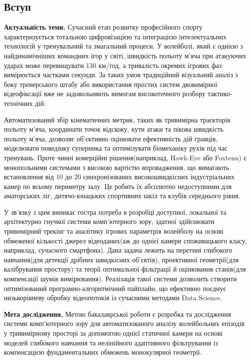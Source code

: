 \begin{unnumbered}

\section{Вступ}
\textbf{Актуальність теми. } Сучасний етап розвитку професійного спорту  характеризується тотальною цифровізацією та
інтеграцією інтелектуальних  технологій у тренувальний та змагальний процеси. У волейболі, який є однією з
найдинамічніших командних ігор у світі, швидкість польоту м'яча при  атакуючих ударах може перевищувати 130 км/год,
а тривалість окремих ігрових фаз вимірюється частками секунди. За таких умов традиційний візуальний аналіз з боку
тренерського штабу або використання простих систем двовимірної відеофіксації вже не задовольняють вимогам високоточного
розбору тактико-технічних дій.

Автоматизований збір кінематичних метрик, таких як тривимірна траєкторія польоту м'яча, координати точок відскоку,
кути атаки та пікова швидкість польоту м'яча, дозволяє об'єктивно оцінювати ефективність дій гравців, моделювати
поведінку суперника та оптимізувати біомеханіку рухів під
час тренувань. Проте чинні комерційні рішення(наприклад, Hawk-Eye або Foxtenn) є монопольними системами з високою
вартістю впровадження, що вимагають встановлення від 10 до 20 синхронізованих високошвидкісних індустріальних камер
по всьому периметру залу. Це робить їх абсолютно недоступними для аматорських ліг, дитячо-юнацьких спортивних шкіл
та клубів середнього рівня.

У зв'язку з цим виникає гостра потреба в розробці доступної, локальної та архітектурно гнучкої системи комп'ютерного
зору, здатної здійснювати тривимірний трекінг та аналітику ігрових параметрів волейболу на основі обмеженої
кількості джерел відеоданих(аж до однієї камери споживацького класу, наприклад, сучасного смартфона). Дана задача
лежить на перетині глибокого навчання(для детекції дрібних швидкісних об'єктів), проективної геометрії(для
калібрування простору) та теорії оптимальної фільтрації й оцінювання станів(для компенсації шумів вимірювання).
Реалізація такої системи дозволить створити оптимізований програмно-алгоритмічний пайплайн, що ефективно поєднує
низькорівневу обробку відеопотоків із сучасними методами Data Science.

\textbf{Мета дослідження. } Метою бакалаврської роботи є розробка та дослідження системи комп'ютерного зору
для автоматизованого аналізу волейбольних епізодів у тривимірному просторі за допомогою однієї
статичної камери на основі моделей глибокого навчання та нелінійного адаптивного фільтрування
із компенсацією фундаментальних обмежень монокулярної геометрії.


\end{unnumbered}
